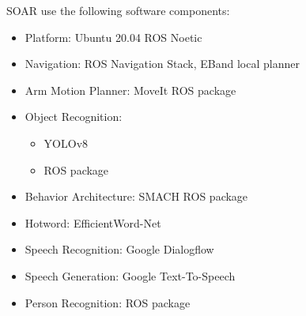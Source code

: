 SOAR use the following software components:

\begin{itemize}
	\item Platform: Ubuntu 20.04 ROS Noetic
	\item Navigation: ROS Navigation Stack, EBand local planner
	\item Arm Motion Planner: MoveIt ROS package
	\item Object Recognition:
	      \begin{itemize}
		      \item YOLOv8
		      \item {} ROS package
	      \end{itemize}
	\item Behavior Architecture: SMACH ROS package
	\item Hotword: EfficientWord-Net
	\item Speech Recognition: Google Dialogflow
	\item Speech Generation: Google Text-To-Speech
	\item Person Recognition:  ROS package
\end{itemize}
